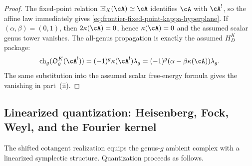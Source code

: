 \begin{proof}
The fixed-point relation $\mathbb H_X(\cA)\simeq \cA$ identifies $\cA$ with
$\cA^!$, so the affine law immediately gives
\eqref{eq:frontier-fixed-point-kappa-hyperplane}. If
$(\alpha,\beta)=(0,1)$, then $2\kappa(\cA)=0$, hence $\kappa(\cA)=0$ and the
assumed scalar genus tower vanishes. The all-genus propagation is
exactly the assumed $H_D^K$ package:
\[
\operatorname{ch}_g(\mathfrak O_g^K(\cA^!))
=(-1)^g\kappa(\cA^!)\lambda_g
=(-1)^g(\alpha-\beta\kappa(\cA))\lambda_g.
\]
The same substitution into the assumed scalar free-energy formula gives the vanishing in
part~(ii).
\end{proof}

\subsection{Linearized quantization: Heisenberg, Fock, Weyl, and the Fourier kernel}
\label{subsec:frontier-linearized-quantization}

The shifted cotangent realization equips the genus-$g$ ambient complex with a
linearized symplectic structure. Quantization proceeds as follows.

